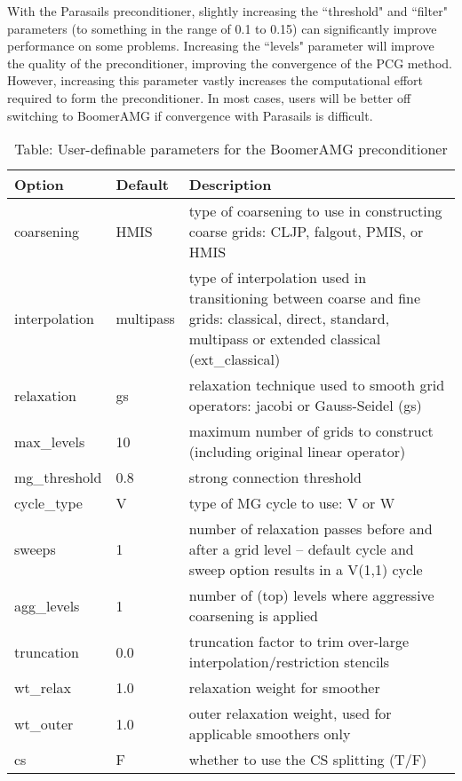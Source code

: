 \documentclass[11pt]{report}
\numberwithin{equation}{section}
\begin{document}
With the Parasails preconditioner, slightly increasing the ``threshold" and ``filter" parameters 
(to something in the range of 0.1 to 0.15) can significantly improve performance on some problems.  Increasing the
``levels" parameter will improve the quality of the preconditioner, improving the convergence of the PCG method.  
However, increasing this parameter vastly increases the computational effort required to form the preconditioner.  
In most cases, users will be better off switching to BoomerAMG if convergence with Parasails is difficult.

%
\begin{table}[htb]
\setlength{\extrarowheight}{5.0pt}
\small
\begin{tabular}[htb] { | p{1in} | p{0.5in} | p{4.0in} |  }
\hline 
Option & Default & Description \\
\hline \hline 
coarsening & HMIS & type of coarsening to use in constructing coarse grids: CLJP, falgout, PMIS, or HMIS  \\
interpolation & multipass & type of interpolation used in transitioning between coarse and fine grids: classical, direct, standard, multipass or extended classical (ext\_classical) \\
relaxation & gs & relaxation technique used to smooth grid operators: jacobi or Gauss-Seidel (gs)  \\
max\_levels & 10 & maximum number of grids to construct (including original linear operator)  \\
mg\_threshold & 0.8 & strong connection threshold  \\
cycle\_type & V & type of MG cycle to use: V or W  \\
sweeps & 1 & number of relaxation passes before and after a grid level -- default cycle and sweep option results in a V(1,1) cycle  \\
agg\_levels & 1 & number of (top) levels where aggressive coarsening is applied \\
truncation & 0.0 & truncation factor to trim over-large interpolation/restriction stencils \\
wt\_relax & 1.0 & relaxation weight for smoother \\
wt\_outer & 1.0 & outer relaxation weight, used for applicable smoothers only \\
cs & F & whether to use the CS splitting (T/F) \\ \hline
\end{tabular}
\caption{Table: User-definable parameters for the BoomerAMG preconditioner}	
\normalsize
\end{table}
\end{document}
